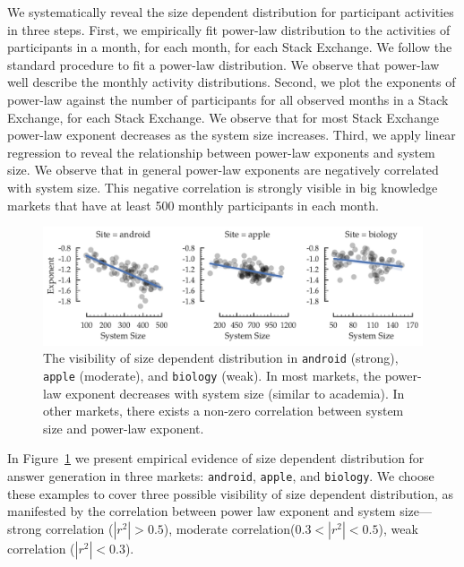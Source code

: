 We systematically reveal the size dependent distribution for participant activities in three steps. First, we empirically fit power-law distribution to the activities of participants in a month, for each month, for each Stack Exchange. We follow the standard procedure to fit a power-law distribution. We observe that power-law well describe the monthly activity distributions. Second, we plot the exponents of power-law against the number of participants for all observed months in a Stack Exchange, for each Stack Exchange. We observe that for most Stack Exchange power-law exponent decreases as the system size increases. Third, we apply linear regression to reveal the relationship between power-law exponents and system size. We observe that in general power-law exponents are negatively correlated with system size. This negative correlation is strongly visible in big knowledge markets that have at least 500 monthly participants in each month.

\begin{figure}[hbt]
\vspace{-0.5\baselineskip}
\centering
\includegraphics[scale=0.38]{Figures/Size_Dependent_Distribution.pdf}
\vspace{-2\baselineskip}
\caption{The visibility of size dependent distribution in \texttt{android} (strong), \texttt{apple} (moderate), and \texttt{biology} (weak). In most markets, the power-law exponent decreases with system size (similar to academia). In other markets, there exists a non-zero correlation between system size and power-law exponent.}
\vspace{-\baselineskip}
\label{fig:sdd}
\end{figure}

In Figure~\ref{fig:sdd} we present empirical evidence of size dependent distribution for answer generation in three markets: \texttt{android}, \texttt{apple}, and \texttt{biology}. We choose these examples to cover three possible visibility of size dependent distribution, as manifested by the correlation between 
power law exponent and system size---strong correlation ($|r^2|>0.5$), moderate correlation($0.3<|r^2|<0.5$), weak correlation ($|r^2|<0.3$).

